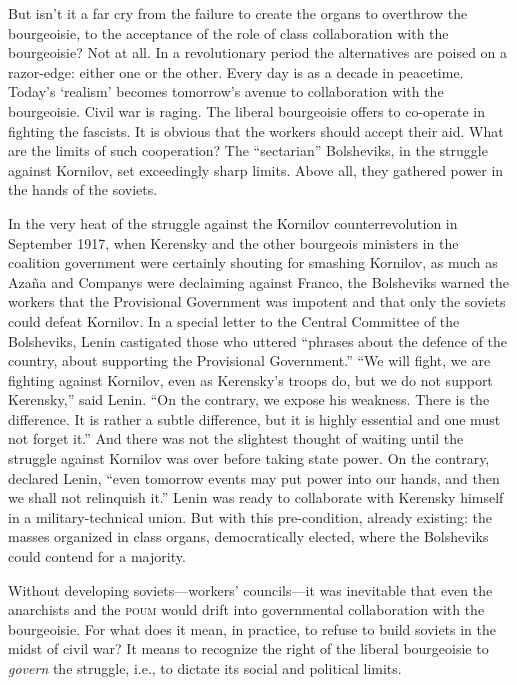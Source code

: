 But isn’t it a far cry from the failure to create the organs to overthrow the bourgeoisie, to the acceptance of the role of class collaboration with the bourgeoisie? Not at all. In a revolutionary period the alternatives are poised on a razor-edge: either one or the other. Every day is as a decade in peacetime. Today’s ‘realism’ becomes tomorrow’s avenue to collaboration with the bourgeoisie. Civil war is raging. The liberal bourgeoisie offers to co-operate in fighting the fascists. It is obvious that the workers should accept their aid. What are the limits of such cooperation? The ``sectarian'' Bolsheviks, in the struggle against Kornilov, set exceedingly sharp limits. Above all, they gathered power in the hands of the soviets.

In the very heat of the struggle against the Kornilov counterrevolution in September 1917, when Kerensky and the other bourgeois ministers in the coalition government were certainly shouting for smashing Kornilov, as much as Azaña and Companys were declaiming against Franco, the Bolsheviks warned the workers that the Provisional Government was impotent and that only the soviets could defeat Kornilov. In a special letter to the Central Committee of the Bolsheviks, Lenin castigated those who uttered ``phrases about the defence of the country, about supporting the Provisional Government.'' ``We will fight, we are fighting against Kornilov, even as Kerensky’s troops do, but we do not support Kerensky,'' said Lenin. ``On the contrary, we expose his weakness. There is the difference. It is rather a subtle difference, but it is highly essential and one must not forget it.'' And there was not the slightest thought of waiting until the struggle against Kornilov was over before taking state power. On the contrary, declared Lenin, ``even tomorrow events may put power into our hands, and then we shall not relinquish it.'' Lenin was ready to collaborate with Kerensky himself in a military-technical union. But with this pre-condition, already existing: the masses organized in class organs, democratically elected, where the Bolsheviks could contend for a majority.

Without developing soviets---workers’ councils---it was inevitable that even the anarchists and the \textsc{poum} would drift into governmental collaboration with the bourgeoisie. For what does it mean, in practice, to refuse to build soviets in the midst of civil war? It means to recognize the right of the liberal bourgeoisie to \emph{govern} the struggle, i.e., to dictate its social and political limits.

